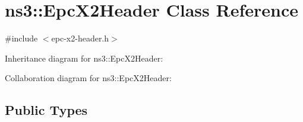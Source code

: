 \hypertarget{classns3_1_1EpcX2Header}{}\section{ns3\+:\+:Epc\+X2\+Header Class Reference}
\label{classns3_1_1EpcX2Header}


{\ttfamily \#include $<$epc-\/x2-\/header.\+h$>$}



Inheritance diagram for ns3\+:\+:Epc\+X2\+Header\+:


Collaboration diagram for ns3\+:\+:Epc\+X2\+Header\+:
\subsection*{Public Types}
